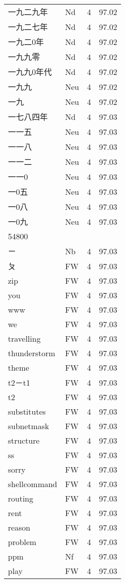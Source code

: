 \documentclass[twocolumn]{book}
\begin{document}
\begin{supertabular}{llrr}
一九二九年 & Nd & 4 &  97.02\\
一九二七年 & Nd & 4 &  97.02\\
一九二0年 & Nd & 4 &  97.02\\
一九九零 & Nd & 4 &  97.02\\
一九九0年代 & Nd & 4 &  97.02\\
一九九 & Neu & 4 &  97.02\\
一九 & Neu & 4 &  97.02\\
一七八四年 & Nd & 4 &  97.03\\
一一五 & Neu & 4 &  97.03\\
一一八 & Neu & 4 &  97.03\\
一一二 & Neu & 4 &  97.03\\
一一0 & Neu & 4 &  97.03\\
一0五 & Neu & 4 &  97.03\\
一0八 & Neu & 4 &  97.03\\
一0九 & Neu & 4 &  97.03\\
54800\\
ㄧ & Nb & 4 &  97.03\\
ㄆ & FW & 4 &  97.03\\
zip & FW & 4 &  97.03\\
you & FW & 4 &  97.03\\
www & FW & 4 &  97.03\\
we & FW & 4 &  97.03\\
travelling & FW & 4 &  97.03\\
thunderstorm & FW & 4 &  97.03\\
theme & FW & 4 &  97.03\\
t2－t1 & FW & 4 &  97.03\\
t2 & FW & 4 &  97.03\\
substitutes & FW & 4 &  97.03\\
subnetmask & FW & 4 &  97.03\\
structure & FW & 4 &  97.03\\
ss & FW & 4 &  97.03\\
sorry & FW & 4 &  97.03\\
shellcommand & FW & 4 &  97.03\\
routing & FW & 4 &  97.03\\
rent & FW & 4 &  97.03\\
reason & FW & 4 &  97.03\\
problem & FW & 4 &  97.03\\
ppm & Nf & 4 &  97.03\\
play & FW & 4 &  97.03\\

\end{supertabular}
\end{document}
